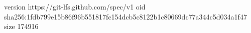 version https://git-lfs.github.com/spec/v1
oid sha256:1fdb799e15b86f96b551817fc154dcb5c8122b1c80669dc77a344c5d034a1f47
size 174916
